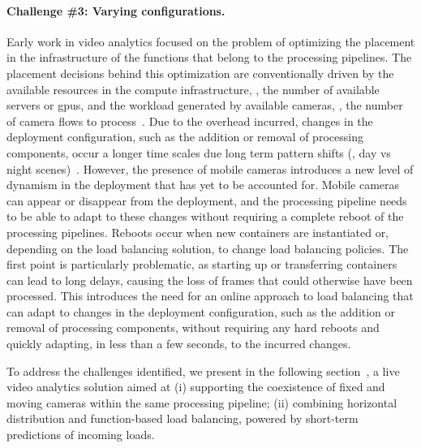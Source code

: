 \paragraph{Challenge \#3: Varying configurations.} Early work in video analytics focused on the problem of optimizing the placement in the infrastructure of the functions that belong to the processing pipelines. The placement decisions behind this optimization are conventionally driven by the available resources in the compute infrastructure, \ie, the number of available servers or \acrshort{gpu}s, and the workload generated by available cameras, \ie, the number of camera flows to process~\cite{ao2018sprocket,zhang2017live,fouladi2017encoding}. Due to the overhead incurred, changes in the deployment configuration, such as the addition or removal of processing components, occur a longer time scales due long term pattern shifts (\eg, day vs night scenes)~\cite{jiang2018chameleon,zeng2020distream}. However, the presence of mobile cameras introduces a new level of dynamism in the deployment that has yet to be accounted for. Mobile cameras can appear or disappear from the deployment, and the processing pipeline needs to be able to adapt to these changes without requiring a complete reboot of the processing pipelines. Reboots occur when new containers are instantiated or, depending on the load balancing solution, to change load balancing policies. The first point is particularly problematic, as starting up or transferring containers can lead to long delays, causing the loss of frames that could otherwise have been processed. This introduces the need for an online approach to load balancing that can adapt to changes in the deployment configuration, such as the addition or removal of processing components, without requiring any hard reboots and quickly adapting, in less than a few seconds, to the incurred changes.


To address the challenges identified, we present in the following section~\videojam{}, a live video analytics solution aimed at (i) supporting the coexistence of fixed and moving cameras within the same processing pipeline; (ii) combining horizontal distribution and function-based load balancing, powered by short-term predictions of incoming loads.